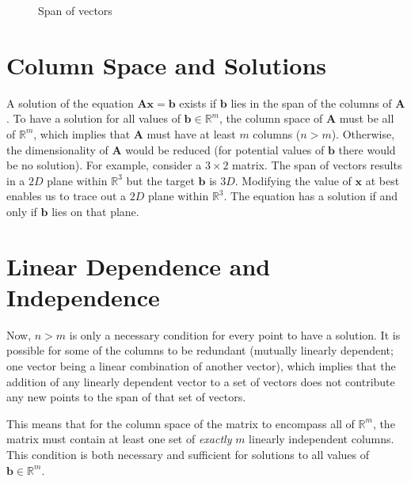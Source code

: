 \para

\begin{figure}[ht]
    \centering
    
    \caption{Span of vectors}
    \label{Vector span2}
\end{figure}

\para

\section{Column Space and Solutions}

A solution of the equation \(\mathbf{A}\mathbf{x} = \mathbf{b}\) exists if \(\mathbf{b}\) lies in the span of the columns of \(\mathbf{A}\). To have a solution for all values of \(\mathbf{b} \in \mathbb{R}^{m}\), the column space of \(\mathbf{A}\) must be all of \(\mathbb{R}^{m}\), which implies that \(\mathbf{A}\) must have at least \(m\) columns (\(n > m\)). Otherwise, the dimensionality of \(\mathbf{A}\) would be reduced (for potential values of \(\mathbf{b}\) there would be no solution). For example, consider a \(3 \times 2\) matrix. The span of vectors results in a \(2D\) plane within \(\mathbb{R}^{3}\) but the target \(\mathbf{b}\) is \(3D\). Modifying the value of \(\mathbf{x}\) at best enables us to trace out a \(2D\) plane within \(\mathbb{R}^{3}\). The equation has a solution if and only if \(\mathbf{b}\) lies on that plane.

\clearpage
\newpage

\section{Linear Dependence and Independence}

Now, \(n > m\) is only a necessary condition for every point to have a solution. It is possible for some of the columns to be redundant (mutually linearly dependent; one vector being a linear combination of another vector), which implies that the addition of any linearly dependent vector to a set of vectors does not contribute any new points to the span of that set of vectors.

\para

This means that for the column space of the matrix to encompass all of \(\mathbb{R}^{m}\), the matrix must contain at least one set of \textit{exactly} \(m\) linearly independent columns. This condition is both necessary and sufficient for solutions to all values of \(\mathbf{b} \in \mathbb{R}^{m}\).

